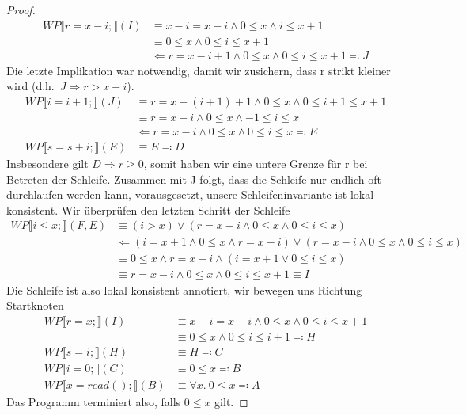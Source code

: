 \documentclass[hidelinks]{article}
\theoremstyle{plain}
\theoremstyle{definition}
\theoremstyle{rem}
\begin{document}
\begin{sloppypar}
\begin{proof}
\begin{align*}
WP\llbracket r=x-i;\rrbracket(I)&\equiv x-i=x-i\wedge 0\le x \wedge i\le x+1\\
&\equiv 0\le x \wedge 0\le i \le x+1\\
&\Leftarrow r=x-i+1 \wedge 0\le x \wedge 0\le i \le x+1\eqqcolon J
\end{align*}
Die letzte Implikation war notwendig, damit wir zusichern, dass r strikt kleiner wird (d.h.\ $J\Rightarrow r>x-i$).
\begin{align*}
WP\llbracket i=i+1;\rrbracket(J)&\equiv r=x-(i+1)+1 \wedge 0\le x \wedge 0\le i+1 \le x+1\\
&\equiv r=x-i \wedge 0\le x \wedge -1\le i \le x\\
&\Leftarrow r= x-i \wedge 0\le x \wedge 0\le i \le x\eqqcolon E\\
WP\llbracket s=s+i;\rrbracket(E)&\equiv E\eqqcolon D
\end{align*}
Insbesondere gilt $D\Rightarrow r\ge 0$, somit haben wir eine untere Grenze für r bei Betreten der Schleife. Zusammen mit J folgt, dass die Schleife nur endlich oft durchlaufen werden kann, vorausgesetzt, unsere Schleifeninvariante ist lokal konsistent. Wir überprüfen den letzten Schritt der Schleife
\begin{align*}
WP\llbracket i\le x;\rrbracket(F,E)&\equiv (i>x)\vee(r= x-i \wedge 0\le x \wedge 0\le i \le x)\\
&\Leftarrow (i=x+1 \wedge 0\le x \wedge r=x-i)\vee(r=x-i \wedge 0\le x \wedge 0\le i \le x)\\
&\equiv 0\le x \wedge r=x-i \wedge (i=x+1 \vee 0\le i \le x)\\
&\equiv r=x-i \wedge 0\le x \wedge 0\le i \le x+1\equiv I
\end{align*}
Die Schleife ist also lokal konsistent annotiert, wir bewegen uns Richtung Startknoten
\begin{align*}
WP\llbracket r=x;\rrbracket(I)&\equiv x-i=x-i \wedge 0\le x \wedge 0\le i \le x+1\\
&\equiv 0\le x \wedge 0 \le i\le i+1\eqqcolon H\\
WP\llbracket s=i;\rrbracket(H)&\equiv H\eqqcolon C\\
WP\llbracket i=0;\rrbracket(C)&\equiv 0\le x\eqqcolon B\\
WP\llbracket x=read();\rrbracket(B)&\equiv \forall x.\ 0\le x\eqqcolon A
\end{align*}
Das Programm terminiert also, falls $0\le x$ gilt.
\end{proof}

\end{sloppypar}
\end{document}
